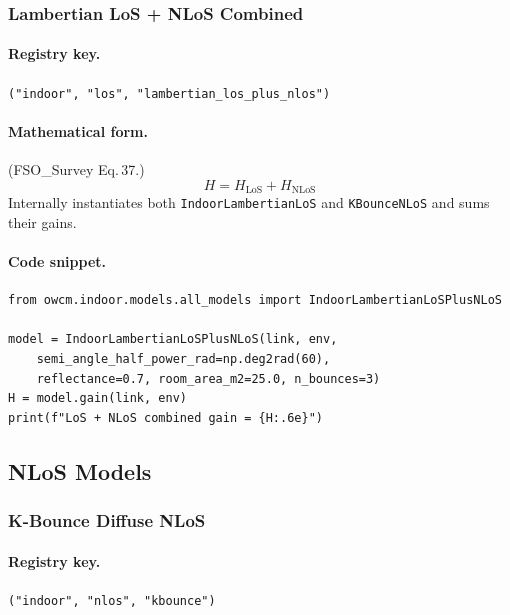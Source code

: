 \documentclass[11pt,a4paper]{article}
\begin{document}
\subsubsection{Lambertian LoS + NLoS Combined}
\label{sec:indoor_los_nlos}

\paragraph{Registry key.} \texttt{("indoor", "los", "lambertian\_los\_plus\_nlos")}

\paragraph{Mathematical form.}
(FSO\_Survey Eq.\,37.)
\begin{equation}
\boxed{H = H_{\text{LoS}} + H_{\text{NLoS}}}
\end{equation}
Internally instantiates both \texttt{IndoorLambertianLoS} and
\texttt{KBounceNLoS} and sums their gains.

\paragraph{Code snippet.}
\begin{lstlisting}
from owcm.indoor.models.all_models import IndoorLambertianLoSPlusNLoS

model = IndoorLambertianLoSPlusNLoS(link, env,
    semi_angle_half_power_rad=np.deg2rad(60),
    reflectance=0.7, room_area_m2=25.0, n_bounces=3)
H = model.gain(link, env)
print(f"LoS + NLoS combined gain = {H:.6e}")
\end{lstlisting}

\subsection{NLoS Models}

\subsubsection{K-Bounce Diffuse NLoS}
\label{sec:kbounce}

\paragraph{Registry key.} \texttt{("indoor", "nlos", "kbounce")}
\end{document}
